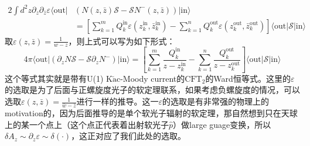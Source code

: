 \begin{equation}
	\begin{aligned}
		2\int d^2z\partial_z\partial_{\bar{z}}\varepsilon\langle\text{out}|&\left(N(z,\bar{z})\mathcal{S}-\mathcal{S}N^-(z,\bar{z})\right)|\text{in}\rangle\\&=\left[\sum_{k=1}^mQ_k^\text{in}\varepsilon(z_k^\text{in},\bar{z}_k^\text{in})-\sum_{k=1}^nQ_k^\text{out}\varepsilon(z_k^\text{out},{\bar{z}}_k^\text{out})\right]\langle\text{out}|\mathcal{S}|\text{in}\rangle
	\end{aligned}
\end{equation}
取$\varepsilon(z,\bar z)=\frac{1}{w-z}$，则上式可以写为如下形式：
\begin{equation}\label{eq:24.5}
	4\pi\langle\mathrm{out}|\left(\partial_zN\mathcal{S}-\mathcal{S}\partial_zN^-\right)|\mathrm{in}\rangle=\left[\sum_{k=1}^m\frac{Q_k^\mathrm{in}}{z-z_k^\mathrm{in}}-\sum_{k=1}^n\frac{Q_k^\mathrm{out}}{z-z_k^\mathrm{out}}\right]\langle\mathrm{out}|\mathcal{S}|\mathrm{in}\rangle 
\end{equation}
这个等式其实就是带有U(1) K$\breve{\text{a}}$c-Moody current的$\text{CFT}_2$的Ward恒等式\cite{Blumenhagen:2009zz,He:2015zea,Strominger:2013lka,Nande:2017dba}。这里的$\varepsilon$的选取是为了后面与正螺旋度光子的软定理联系，如果考虑负螺旋度的情况，可以选取$\varepsilon(z,\bar z)=\frac{1}{\bar w-\bar z}$进行一样的推导。这一$\varepsilon$的选取是有非常强的物理上的motivation的，因为后面推导的是单个软光子辐射的软定理，那自然想到只在天球上的某一个点上（这个点正代表着出射软光子$\hat p$）做large guage变换，所以$\delta A_z\sim\partial_z\varepsilon\sim\delta(\cdot)$，这正对应了我们此处的选取。

